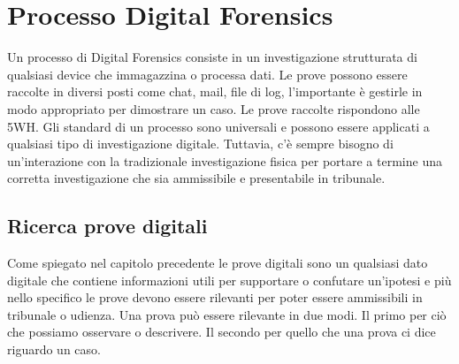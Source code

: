 \chapter{Processo Digital Forensics}
Un processo di Digital Forensics consiste in un investigazione strutturata di qualsiasi device che immagazzina o processa dati. 
Le prove possono essere raccolte in diversi posti come chat, mail, file di log, l'importante è gestirle in modo appropriato per dimostrare un caso. Le prove raccolte rispondono alle 5WH. Gli standard di un processo sono universali e possono essere applicati a qualsiasi tipo di investigazione digitale. Tuttavia, c'è sempre bisogno di un'interazione con la tradizionale investigazione fisica per portare a termine una corretta investigazione che sia ammissibile e presentabile in tribunale.


\section{Ricerca prove digitali}
Come spiegato nel capitolo precedente le prove digitali sono un qualsiasi dato digitale che contiene informazioni utili per supportare o confutare un'ipotesi e più nello specifico le prove devono essere rilevanti per poter essere ammissibili in tribunale o udienza.
Una prova può essere rilevante in due modi. Il primo per ciò che possiamo osservare o descrivere. Il secondo per quello che una prova ci dice riguardo un caso.